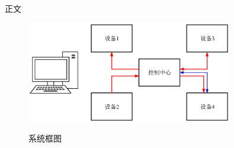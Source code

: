 正文

\begin{figure}[htbp]
	\centering
	\includegraphics[width=0.8\textwidth]{VisioDrawing.eps}\\
	\caption{系统框图}\label{fig:system4}
\end{figure}